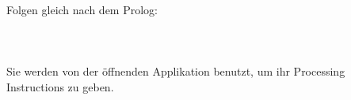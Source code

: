 Folgen gleich nach dem Prolog:\\

\\

\\\\
Sie werden von der öffnenden Applikation benutzt, um ihr Processing Instructions zu geben.